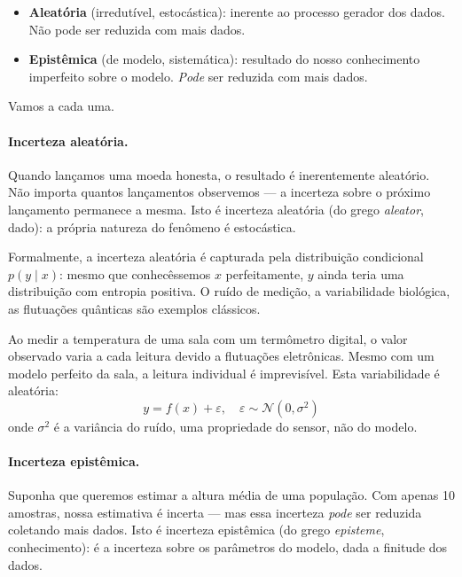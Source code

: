 \documentclass{tufte-handout}
\begin{document}
\begin{itemize}
    \item \textbf{Aleatória} (irredutível, estocástica): inerente ao processo gerador dos
    dados. Não pode ser reduzida com mais dados.
    \item \textbf{Epistêmica} (de modelo, sistemática): resultado do nosso conhecimento
    imperfeito sobre o modelo. \textit{Pode} ser reduzida com mais dados.
\end{itemize}

Vamos a cada uma.

\paragraph{Incerteza aleatória.}

Quando lançamos uma moeda honesta, o resultado é inerentemente aleatório. Não importa
quantos lançamentos observemos --- a incerteza sobre o próximo lançamento permanece a
mesma. Isto é incerteza aleatória (do grego \textit{aleator}, dado): a própria natureza
do fenômeno é estocástica.

Formalmente, a incerteza aleatória é capturada pela distribuição condicional
$p(y \mid x)$: mesmo que conhecêssemos $x$ perfeitamente, $y$ ainda teria uma
distribuição com entropia positiva. O ruído de medição, a variabilidade biológica, as
flutuações quânticas são exemplos clássicos.

\begin{exmp}
    Ao medir a temperatura de uma sala com um termômetro digital, o valor observado
    varia a cada leitura devido a flutuações eletrônicas. Mesmo com um modelo perfeito
    da sala, a leitura individual é imprevisível. Esta variabilidade é aleatória:
    \[
    y = f(x) + \varepsilon, \quad \varepsilon \sim \mathcal{N}(0, \sigma^2)
    \]
    onde $\sigma^2$ é a variância do ruído, uma propriedade do sensor, não do modelo.
\end{exmp}

\paragraph{Incerteza epistêmica.}

Suponha que queremos estimar a altura média de uma população. Com apenas 10 amostras,
nossa estimativa é incerta --- mas essa incerteza \textit{pode} ser reduzida coletando
mais dados. Isto é incerteza epistêmica (do grego \textit{episteme}, conhecimento):
é a incerteza sobre os parâmetros do modelo, dada a finitude dos dados.
\end{document}
